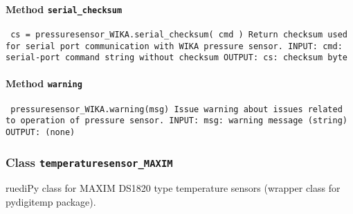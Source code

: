 \paragraph{Method \texttt{serial_checksum}}
\vspace{1ex}
\texttt{\newline
cs = pressuresensor_WIKA.serial_checksum( cmd )\newline
\newline
Return checksum used for serial port communication with WIKA pressure sensor.\newline
\newline
INPUT:\newline
cmd: serial-port command string without checksum\newline
\newline
OUTPUT:\newline
cs: checksum byte\newline
\newline
}

\paragraph{Method \texttt{warning}}
\vspace{1ex}
\texttt{\newline
pressuresensor_WIKA.warning(msg)\newline
\newline
Issue warning about issues related to operation of pressure sensor.\newline
\newline
INPUT:\newline
msg: warning message (string)\newline
\newline
OUTPUT:\newline
(none)\newline
\newline
}

\subsubsection{Class \texttt{temperaturesensor_MAXIM}}
\par
ruediPy class for MAXIM DS1820 type temperature sensors (wrapper class for pydigitemp package).\par

